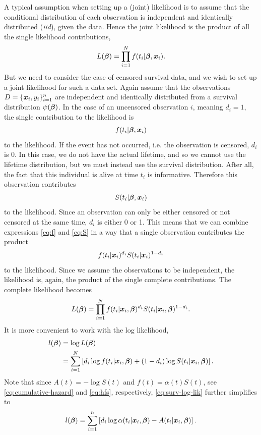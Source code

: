 A typical assumption when setting up a (joint) likelihood is to assume that the conditional distribution of each observation is independent and identically distributed (\textit{iid}), given the data.
Hence the joint likelihood is the product of all the single likelihood contributions,
\begin{equation}
    L(\boldsymbol{\beta})=\prod_{i=1}^N f(t_i|\boldsymbol{\beta},\bm{x}_i).
\end{equation}
But we need to consider the case of censored survival data, and we wish to set up a joint likelihood for such a data set.
Again assume that the observations $D=\{\bm{x}_i,y_i\}_{i=1}^n$ are independent and identically distributed from a survival distribution $\psi(\boldsymbol{\beta})$.
In the case of an uncensored observation $i$, meaning $d_i=1$, the single contribution to the likelihood is
\begin{equation}\label{eq:f}
    f(t_i|\boldsymbol{\beta},\bm{x}_{i})
\end{equation}
to the likelihood.
If the event has not occurred, i.e. the observation is censored, $d_i$ is 0.
In this case, we do not have the actual lifetime, and so we cannot use the lifetime distribution, but we must instead use the survival distribution.
After all, the fact that this individual is alive at time $t_i$ is informative.
Therefore this observation contributes
\begin{equation}\label{eq:S}
    S(t_i|\boldsymbol{\beta},\bm{x}_{i})
\end{equation}
to the likelihood.
Since an observation can only be either censored or not censored at the same time, $d_i$ is either 0 or 1.
This means that we can combine expressions \eqref{eq:f} and \eqref{eq:S} in a way that a single observation contributes the product
\begin{equation*}
    f(t_{i}|\bm{x}_i)^{d_i}S(t_{i}|\bm{x}_i)^{1-d_i}
\end{equation*}
to the likelihood.
Since we assume the observations to be independent, the likelihood is, again, the product of the single complete contributions.
The complete likelihood becomes
\begin{equation}\label{eq:surv-lik}
    L(\boldsymbol{\beta})=\prod_{i=1}^N f(t_i|\bm{x}_i,\boldsymbol{\beta})^{d_i} S(t_i|\bm{x}_i,\boldsymbol{\beta})^{1-d_i}.
\end{equation}
It is more convenient to work with the log likelihood,
\begin{align}\label{eq:surv-log-lik}
\begin{split}
    l(\boldsymbol{\beta})&=\log L(\boldsymbol{\beta}) \\
    &=\sum_{i=1}^N\left[ d_i \log f(t_i|\bm{x}_i,\boldsymbol{\beta}) + (1-d_i)\log S(t_i|\bm{x}_i,\boldsymbol{\beta})\right].
\end{split}
\end{align}
Note that since $A(t)=-\log S(t)$ and $f(t)=\alpha(t)S(t)$, see \eqref{eq:cumulative-hazard} and \eqref{eq:hfs}, respectively, \eqref{eq:surv-log-lik} further simplifies to
\begin{equation*}
    l(\boldsymbol{\beta})=\sum_{i=1}^n\left[ d_i \log \alpha(t_i|\bm{x}_i,\boldsymbol{\beta}) - A(t_i|\bm{x}_i,\boldsymbol{\beta})\right].
\end{equation*}

